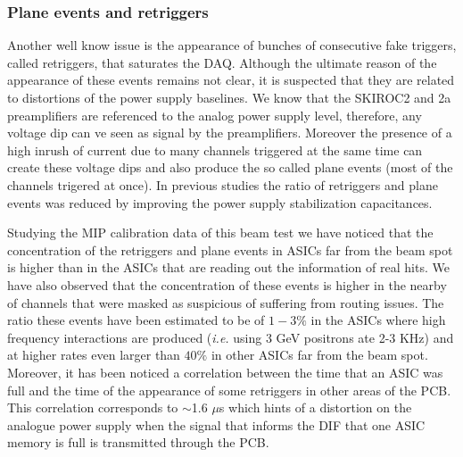 \documentclass[a4paper,11pt]{article}
\begin{document}
\subsubsection*{Plane events and retriggers}

Another well know issue is the appearance of bunches of consecutive fake triggers, called retriggers,
that saturates the DAQ. 
Although the ultimate reason of the appearance of these events remains not clear, it
is suspected that they are related to distortions of the
power supply baselines. We know that the SKIROC2 and 2a preamplifiers are referenced to the analog power supply level,
therefore, any voltage dip can ve seen as signal by the preamplifiers.
Moreover the presence of a high inrush of current
due to many channels triggered at the same time can create these voltage dips
and also produce the so called plane events (most of the channels trigered at once).
In previous studies the ratio of retriggers and plane events
was reduced by improving the power supply stabilization capacitances. %

Studying the MIP calibration data of this beam test we have noticed that the 
concentration of the retriggers and plane events in
ASICs far from the beam spot is higher than in the ASICs that are reading
out the information of real hits. We have also observed that the concentration of these events
is higher in the nearby of channels that were masked as suspicious of suffering from routing issues.
The ratio these events have been estimated to be of $1-3\%$ in the ASICs where high frequency
interactions are produced ({\it i.e.} using 3 GeV positrons ate 2-3 KHz) and at higher rates even larger than $40\%$ in other 
ASICs far from the beam spot. 
Moreover, it has been noticed a correlation between the time that an ASIC was full and the time of the appearance of some 
retriggers in other areas of the PCB. 
This correlation corresponds to $\sim$1.6 $\mu$s which hints
of a distortion on the analogue power supply when
the signal that informs the DIF that one ASIC memory is full is transmitted through the PCB.





\end{document}
